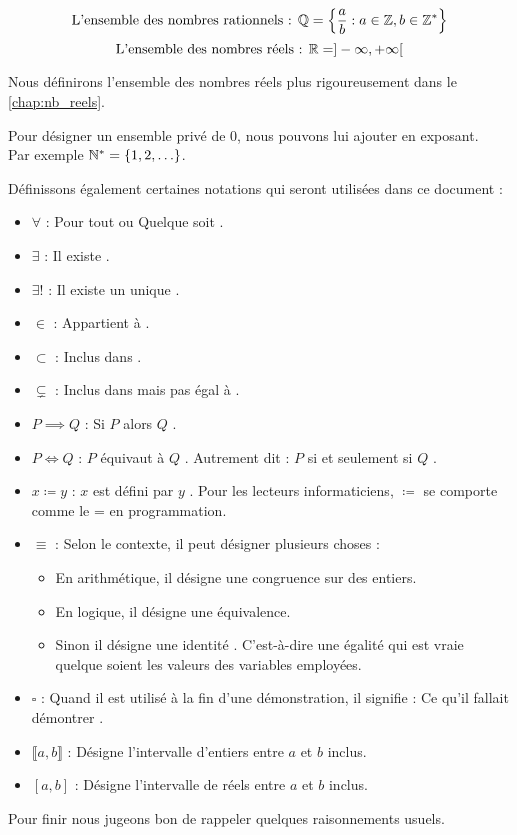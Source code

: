 \[ \text{L'ensemble des nombres rationnels : } \mathbb{Q} = \left\{ \frac{a}{b}  : a \in \mathbb{Z}, b \in \mathbb{Z}^* \right\} \]
\[ \text{L'ensemble des nombres réels : } \mathbb{R} = ]-\infty, +\infty[ \]
\par \noindent Nous définirons l'ensemble des nombres réels plus rigoureusement dans le \autoref{chap:nb_reels}.
\\
\par \noindent Pour désigner un ensemble privé de 0, nous pouvons lui ajouter \og * \fg en exposant. 
\\ 
Par exemple $\mathbb{N}^* = \{1, 2, \ldots\}$.
\\
\par \noindent Définissons également certaines notations qui seront utilisées dans ce document :
\begin{itemize}
    \item $\forall$ : \og Pour tout \fg ou \og Quelque soit \fg.
    \item $\exists$ : \og Il existe \fg.
    \item $\exists!$ : \og Il existe un unique \fg.
    \item $\in$ : \og Appartient à \fg.
    \item $\subset$ : \og Inclus dans \fg.
    \item $\subsetneq$ : \og Inclus dans mais pas égal à \fg.
    \item $P \implies Q$ : \og Si $P$ alors $Q$ \fg.
    \item $P \iff Q$ : \og $P$ équivaut à $Q$ \fg. Autrement dit : \og $P$ si et seulement si $Q$ \fg.
    \item $x \coloneqq y$ : \og $x$ est défini par $y$ \fg. Pour les lecteurs informaticiens, \og $\coloneqq$ \fg se comporte comme le \og = \fg en programmation.
    \item $\equiv$ : Selon le contexte, il peut désigner plusieurs choses \cite{symbole_congru_wikipedia}:
    \begin{itemize}
        \item En arithmétique, il désigne une congruence sur des entiers.
        \item En logique, il désigne une équivalence.
        \item Sinon il désigne une \og identité \fg. C'est-à-dire une égalité qui est vraie quelque soient les valeurs des variables employées.
    \end{itemize}
    \item $\square$ : Quand il est utilisé à la fin d'une démonstration, il signifie : \og Ce qu'il fallait démontrer \fg.
    \item $\llbracket a, b \rrbracket$ : Désigne l'intervalle d'entiers entre $a$ et $b$ inclus.
    \item $[a, b]$ : Désigne l'intervalle de réels entre $a$ et $b$ inclus.
\end{itemize}
\par \noindent Pour finir nous jugeons bon de rappeler quelques raisonnements usuels.

